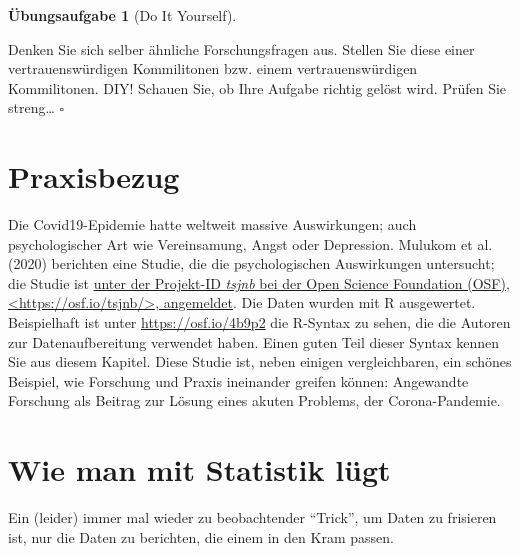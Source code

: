 \documentclass[
  letterpaper,
  twoside,
  open=any]{scrbook}
\theoremstyle{definition}
\theoremstyle{definition}
\newtheorem{exercise}{Übungsaufgabe}[chapter]
\theoremstyle{definition}
\theoremstyle{remark}
\begin{document}
\begin{exercise}[Do It
Yourself]\protect\hypertarget{exr-diy}{}\label{exr-diy}

Denken Sie sich selber ähnliche Forschungsfragen aus. Stellen Sie diese
einer vertrauenswürdigen Kommilitonen bzw. einem vertrauenswürdigen
Kommilitonen. DIY! Schauen Sie, ob Ihre Aufgabe richtig gelöst wird.
Prüfen Sie streng\ldots{} \(\square\)

\end{exercise}

\section{Praxisbezug}\label{praxisbezug-2}

Die Covid19-Epidemie hatte weltweit massive Auswirkungen; auch
psychologischer Art wie Vereinsamung, Angst oder Depression. Mulukom et
al. (2020) berichten eine Studie, die die psychologischen Auswirkungen
untersucht; die Studie ist \href{https://osf.io/tsjnb/}{unter der
Projekt-ID \emph{tsjnb} bei der Open Science Foundation (OSF),
\textless https://osf.io/tsjnb/\textgreater, angemeldet}. Die Daten
wurden mit R ausgewertet. Beispielhaft ist unter
\url{https://osf.io/4b9p2} die R-Syntax zu sehen, die die Autoren zur
Datenaufbereitung verwendet haben. Einen guten Teil dieser Syntax kennen
Sie aus diesem Kapitel. Diese Studie ist, neben einigen vergleichbaren,
ein schönes Beispiel, wie Forschung und Praxis ineinander greifen
können: Angewandte Forschung als Beitrag zur Lösung eines akuten
Problems, der Corona-Pandemie.

\section{Wie man mit Statistik
lügt}\label{wie-man-mit-statistik-luxfcgt-1}

Ein (leider) immer mal wieder zu beobachtender \enquote{Trick}, um Daten
zu frisieren ist, nur die Daten zu berichten, die einem in den Kram
passen.
\end{document}
